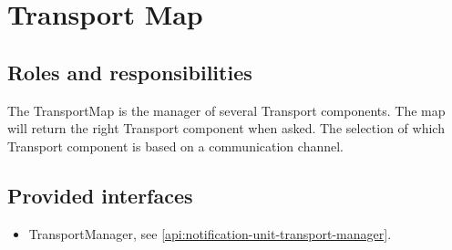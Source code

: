 \section{Transport Map}
\label{element:transport-map}

\subsection{Roles and responsibilities}

\npar The TransportMap is the manager of several Transport components. The
map will return the right Transport component when asked. The selection of
which Transport component is based on a communication channel.

\subsection{Provided interfaces}

\begin{itemize}
  \item TransportManager, see \ref{api:notification-unit-transport-manager}.
\end{itemize}